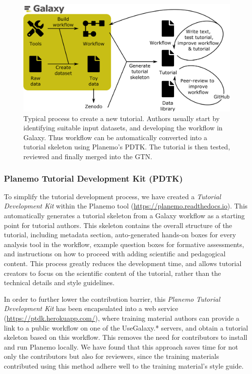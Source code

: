 \documentclass[10pt,letterpaper]{article}
\begin{document}
\begin{figure}[!ht]
	\centering
	\includegraphics[width=\textwidth]{images/contributing.png}
	\caption{Typical process to create a new tutorial\label{fig:contributing}. Authors usually start by identifying suitable input datasets, and developing the workflow in Galaxy. Thus workflow can be automatically converted into a tutorial skeleton using Planemo's PDTK. The tutorial is then tested, reviewed and finally merged into the GTN.}
\end{figure}


\subsubsection*{Planemo Tutorial Development Kit (PDTK)}

To simplify the tutorial development process, we have created a \emph{Tutorial Development Kit} within the Planemo tool (\url{https://planemo.readthedocs.io}). This automatically generates a tutorial skeleton from a Galaxy workflow as a starting point for tutorial authors.
This skeleton contains the overall structure of the tutorial, including metadata section, auto-generated hands-on boxes for every analysis tool in the workflow, example question boxes for formative assessments, and instructions on how to proceed with adding scientific and pedagogical content. 
This process greatly reduces the development time, and allows tutorial creators to focus on the scientific content of the tutorial, rather than the technical details and style guidelines.

In order to further lower the contribution barrier, this \emph{Planemo Tutorial Development Kit} has been encapsulated into a web service (\url{https://ptdk.herokuapp.com/}), where training material authors can provide a link to a public workflow on one of the UseGalaxy.* servers, and obtain a tutorial skeleton based on this workflow. This removes the need for contributors to install and run Planemo locally. We have found that this approach saves time for not only the contributors but also for reviewers, since the training materials contributed using this method adhere well to the training material’s style guide.
\end{document}
